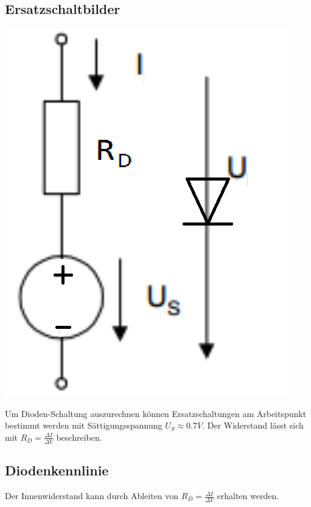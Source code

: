 \subsection{Ersatzschaltbilder}
\begin{minipage}{0.20\textwidth}
	\includegraphics[width=\linewidth,keepaspectratio=true]{./Images/diode_esb}
\end{minipage}%
\begin{minipage}{0.30\textwidth}
	Um Dioden-Schaltung auszurechnen können Ersatzschaltungen am Arbeitspunkt bestimmt werden mit Sättigungsspannung $U_S \approx 0.7V$. Der Widerstand lässt sich mit $R_D = \frac{\Delta I}{\Delta V}$ beschreiben. \\
\end{minipage}

\subsection{Diodenkennlinie}
Der Innenwiderstand kann durch Ableiten von $R_D = \frac{\Delta I}{\Delta V}$ erhalten werden.\\

